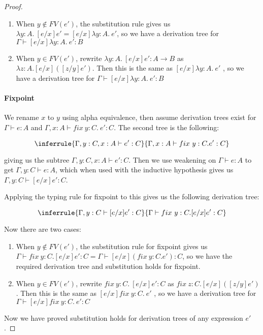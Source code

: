 \begin{proof}
\begin{enumerate}
\item{When $y \notin FV(e')$, the substitution rule gives us $\lambda y:A. \ [e/x]e' = [e/x]\lambda y:A. \ e'$, so we have a derivation tree for $\Gamma \vdash [e/x]\lambda y:A. \ e' : B$}
\item{When $y \in FV(e')$, rewrite $\lambda y:A. \ [e/x]e' : A \to B$ as $\lambda z:A. [e/x]([z/y]e')$. Then this is the same as $[e/x]\lambda y:A. \ e'$ , so we have a derivation tree for $\Gamma \vdash [e/x]\lambda y:A. \ e' : B$} 
\end{enumerate} 


\paragraph{Fixpoint} We rename $x$ to $y$ using alpha equivalence, then assume derivation trees exist for $\Gamma \vdash e : A$ and $\Gamma, x : A \vdash fix \ y:C. \ e' : C$. The second tree is the following:


$$\inferrule{\Gamma, y:C, x:A \vdash e' : C}{\Gamma,x:A \vdash fix \ y:C. e' : C}$$

giving us the subtree $\Gamma, y:C, x:A \vdash e' : C$. Then we use weakening on $\Gamma \vdash e : A$ to get $\Gamma, y : C \vdash e : A$, which when used with the inductive hypothesis gives us $\Gamma, y:C \vdash [e/x]e' : C$. 

Applying the typing rule for fixpoint to this gives us the following derivation tree:

$$\inferrule{\Gamma, y:C \vdash [e/x]e' : C}{\Gamma\vdash fix \ y:C. [e/x]e' : C}$$

Now there are two cases:

\begin{enumerate}
\item{When $y \notin FV(e')$, the substitution rule for fixpoint gives us $\Gamma\vdash fix \ y:C. [e/x]e' : C = \Gamma \vdash [e/x](fix \ y:C. e') : C$, so we have the required derivation tree and substitution holds for fixpoint.}
\item{When $y \in FV(e')$, rewrite $fix \  y:C. \ [e/x]e' : C$ as $fix \ z:C. [e/x]([z/y]e')$. Then this is the same as $[e/x]fix \  y:C. \ e'$ , so we have a derivation tree for $\Gamma \vdash [e/x]fix \  y:C. \ e' : C$}
\end{enumerate}


Now we have proved substitution holds for derivation trees of any expression $e'$.
\end{proof}



